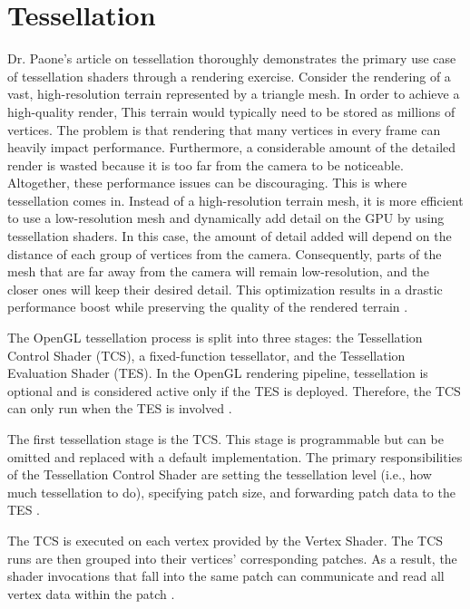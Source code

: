 \documentclass[
  digital,     %
  oneside,     %
  nosansbold,  %
  nocolorbold, %
  lof,         %
  lot,         %
]{fithesis4}
\begin{document}
\chapter{Tessellation}\label{app:tessellation}
Dr. Paone's article on tessellation \cite{openglwiki-tessellation} thoroughly demonstrates the primary use case of tessellation
shaders through a rendering exercise. Consider the rendering of a vast,
high-resolution terrain represented by a triangle mesh. In order to achieve a high-quality render,
This terrain would typically need to be stored as millions of vertices.
The problem is that rendering that many vertices in every frame can heavily impact performance. Furthermore, a
considerable amount of the detailed render is wasted because it is too far from the camera to be
noticeable. Altogether, these performance issues can be discouraging.
This is where tessellation comes in. Instead of a high-resolution terrain mesh, it is more
efficient to use a low-resolution mesh and dynamically add detail on the GPU by using tessellation
shaders. In this case, the amount of detail added will depend on the distance of each group of
vertices from the camera. Consequently, parts of the mesh that are far away from the camera will
remain low-resolution, and the closer ones will keep their desired detail. This optimization results in
a drastic performance boost while preserving the quality of the rendered terrain \cite{learnopengl-tessellation}.

The OpenGL tessellation process is split into three stages: the Tessellation Control Shader (TCS), a
fixed-function tessellator, and the Tessellation Evaluation Shader (TES). In the OpenGL rendering
pipeline, tessellation is optional and is considered active only if the TES is
deployed. Therefore, the TCS can only run when the TES is involved \cite{openglwiki-tessellation}.

The first tessellation stage is the TCS. This stage is programmable but can be
omitted and replaced with a default implementation. The primary responsibilities of the Tessellation
Control Shader are setting the tessellation level (i.e., how much tessellation to do), specifying patch
size, and forwarding patch data to the TES \cite{openglwiki-tcs}.

The TCS is executed on each vertex provided by the Vertex Shader. The TCS
runs are then grouped into their vertices' corresponding patches. As a result, the shader invocations
that fall into the same patch can communicate and read all vertex data within the patch \cite{openglwiki-tcs}.
\end{document}
